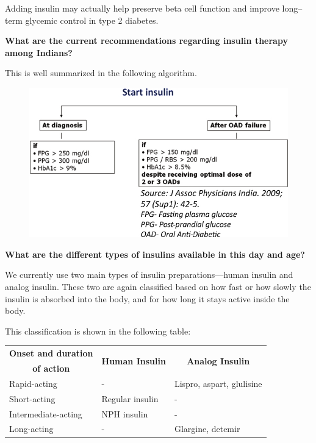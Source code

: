 Adding insulin may actually help preserve beta cell function and improve long–term glycemic control in type 2 diabetes.

\noindent\textbf{What are the current recommendations regarding insulin therapy among Indians?}

This is well summarized in the following algorithm.

\begin{figure}[h]
\centering
\includegraphics[scale=2.3]{images/087.jpg}
\end{figure}

\noindent\textbf{What are the different types of insulins available in this day and age?}

We currently use two main types of insulin preparations—human insulin and analog insulin. These two are again classified based on how fast or how slowly the insulin is absorbed into the body, and for how long it stays active inside the body.

\vskip 5pt

This classification is shown in the following table:

{
\begin{center}
\small\addtolength{\tabcolsep}{-1pt}
\begin{tabular}{|l|l|l|}
\hline
\multicolumn{1}{|c|}{\textbf{Onset and duration}} & \multicolumn{1}{c|}{\multirow{2}{2.3cm}{\textbf{Human Insulin}}} & \multicolumn{1}{c|}{\multirow{2}{2.3cm}{\textbf{Analog Insulin}}}\\
\multicolumn{1}{|c|}{\textbf{of action}} &  & \\
\hline
Rapid-acting & \quad\qquad- & Lispro, aspart, glulisine\\
\hline
Short-acting & Regular insulin & \qquad\qquad-\\
\hline
Intermediate-acting & NPH insulin & \qquad\qquad-\\
\hline
Long-acting & \quad\qquad- & Glargine, detemir\\
\hline
\end{tabular}
\end{center}
}\relax

